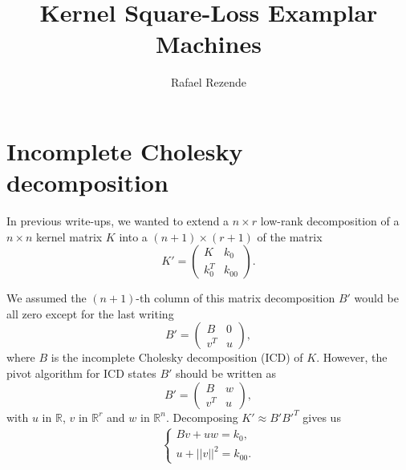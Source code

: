 \documentclass[12pt,letterpaper]{article}
\begin{document}
\def\RR{\mathbb{R}}
\def\PP{\mathbb{P}}
\def\AA{\mathbb{A}}
\def\LL{\mathbb{L}}
\def\SS{\mathbb{S}}
\def\barr{\bar{\mathbb{R}}}
\def\mat#1{{\mathcal{#1}}}
\def\vect#1{\mbox{\boldmath $#1$}}
\def\PPi{\mbox{\boldmath$\Pi$}}
\def\squig{\rightsquigarrow}
\def\comment#1{{}}
\def\qmatrix#1{\left[\begin{matrix}#1\end{matrix}\right]}

\title{Kernel Square-Loss Examplar Machines}
\author{Rafael Rezende}
\maketitle

\section{Incomplete Cholesky decomposition}

In previous write-ups, we wanted to extend a $n\times r$ low-rank decomposition of a $n\times n$ kernel matrix $K$ into a $(n+1)\times (r+1)$ of the matrix 
\begin{equation}
K'=\begin{pmatrix}
K & k_0 \\
k_0^T & k_{00}
\end{pmatrix}.
\end{equation}

We assumed the $(n+1)$-th column of this matrix decomposition $B'$ would be all zero except for the last writing
\begin{equation}
B'=\begin{pmatrix}
B & 0 \\
v^T & u
\end{pmatrix},\label{eq:old}
\end{equation}
where $B$ is the incomplete Cholesky decomposition (ICD) of $K$.
However, the pivot algorithm for ICD states $B'$ should be written as
\begin{equation}
B'=\begin{pmatrix}
B & w \\
v^T & u
\end{pmatrix},\label{eq:new}
\end{equation}
with $u$ in $\RR$, $v$ in $\RR^r$ and $w$ in $\RR^n$. 
Decomposing $K'\approx B'B'^T$ gives us 
\begin{align}
\begin{cases}
Bv+uw=k_0,\\
u+||v||^2=k_{00}.\label{syst:comp}
\end{cases}
\end{align}
\end{document}
